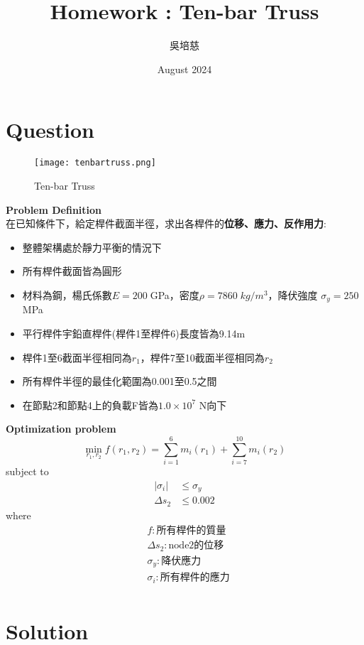 \documentclass[a4paper]{article}
\title{Homework : Ten-bar Truss}
\author{吳培慈}
\date{August 2024}
\begin{document}
\maketitle
\section{Question}

\begin{figure}[h]
    \centering \texttt{[image: tenbartruss.png]}
    \caption{Ten-bar Truss}
\end{figure}

\large
\textbf{Problem Definition}
\\在已知條件下，給定桿件截面半徑，求出各桿件的\textbf{位移、應力、反作用力}:
\begin{itemize}
    \item{整體架構處於靜力平衡的情況下}
    \item{所有桿件截面皆為圓形}
    \item{材料為鋼，楊氏係數$E = 200\;$GPa，密度$\rho = 7860\;kg/m^3$，降伏強度  $\sigma_{y}= 250\;$MPa }
    \item{平行桿件宇鉛直桿件(桿件1至桿件6)長度皆為9.14m}
    \item{桿件1至6截面半徑相同為$r_{1}$，桿件7至10截面半徑相同為$r_{2}$}
    \item{所有桿件半徑的最佳化範圍為0.001至0.5之間}
    \item{在節點2和節點4上的負載F皆為$1.0\times10^7$ N向下}
\end{itemize}

\large
\textbf{Optimization problem}
\[\min_{r_{1},r_{2}} f(r_{1},r_{2}) = \sum_{i=1}^6 m_{i}(r_{1})+\sum_{i=7}^10 m_{i}(r_{2})\]
\qquad subject to
\begin{align*}
|\sigma_{i}|&\leq\sigma_{y} \\
\Delta s_{2}&\leq 0.002
\end{align*}
\qquad where
\begin{align*}
&f:\text{所有桿件的質量}\\
&\Delta s_{2}:\text{node2的位移}\\
&\sigma_{y}:\text{降伏應力}\\
&\sigma_{i}:\text{所有桿件的應力}\\
\end{align*}

\section{Solution}
\end{document}
